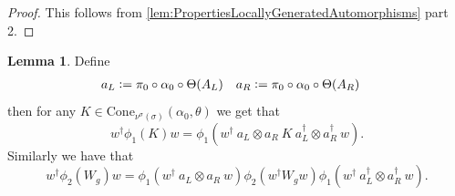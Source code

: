 \documentclass[12pt,a4paper,twoside]{article}
\newcommand{\defeq}{\vcentcolon=}
\theoremstyle{definition}
\newtheorem{lemma}[theorem]{Lemma}
\numberwithin{equation}{section}
\begin{document}
\begin{proof}
	This follows from \ref{lem:PropertiesLocallyGeneratedAutomorphisms} part 2.
\end{proof}
\begin{lemma}
	Define
	\begin{align}
		a_L&\defeq \pi_0\circ\alpha_0\circ\Theta(A_L)&a_R&\defeq \pi_0\circ\alpha_0\circ\Theta(A_R)
	\end{align}
	then for any $K\in\text{Cone}_{\nu^\sigma(\sigma)}(\alpha_0,\theta)$ we get that
	\begin{equation}\label{eq:TranslationOutOfPhi_K}
		w^\dagger \phi_1(K)w=\phi_1(w^\dagger \: a_L\otimes a_R \: K \: a_L^\dagger\otimes a_R^\dagger \: w).
	\end{equation}
	Similarly we have that
	\begin{equation}\label{eq:TranslationOutOfPhi_W}
		w^\dagger \phi_2(W_g)w=\phi_1(w^\dagger \: a_L\otimes a_R \: w)\phi_2(w^\dagger W_g w)\phi_1(w^\dagger \: a_L^\dagger\otimes a_R^\dagger \: w).
	\end{equation}
\end{lemma}
\end{document}

